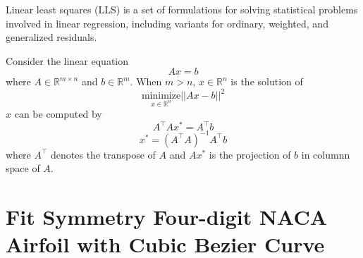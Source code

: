 \documentclass{turgon}
\begin{document}

Linear least squares (LLS) is a set of formulations for solving statistical
problems involved in linear regression, including variants for ordinary,
weighted, and generalized residuals.

Consider the linear equation
\begin{equation}
    Ax = b
    \label{e:lls:leq}
\end{equation}
where $A \in \mathbb{R}^{m \times n}$ and $b \in \mathbb{R}^m$. When $m>n$,
$x \in \mathbb{R}^n$ is the solution of
\begin{equation*}
    \underset{x \in \mathbb{R}^n}{\text{minimize}} ||A x - b||^2
\end{equation*}
$x$ can be computed by
\begin{equation*}
    A^\top A x^* = A^\top b
\end{equation*}
\begin{equation*}
    x^* = (A^\top A)^{-1} A^\top b
    \label{e:lls:sol}
\end{equation*}
where $A^\top$ denotes the transpose of $A$ and $Ax^*$ is the projection of
$b$ in columnn space of $A$.

\chapter{Fit Symmetry Four-digit NACA Airfoil with Cubic Bezier Curve}

\end{document}
